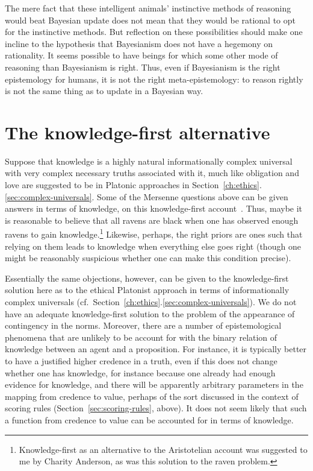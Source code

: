 The mere fact that these intelligent animals' instinctive methods of reasoning would beat Bayesian update does not mean that they would be rational to opt for the instinctive methods. But reflection on these possibilities should make one incline to 
the hypothesis that Bayesianism does not have a hegemony on rationality. It seems possible to have beings for which some
other mode of reasoning than Bayesianism is right. Thus, even if Bayesianism is the right epistemology for humans,
it is not the right meta-epistemology: to reason rightly is not the same thing as to update in a Bayesian way. 

\section{The knowledge-first alternative}
Suppose that knowledge is a highly natural informationally complex universal with very complex necessary 
truths associated with it, much like obligation and love are suggested to be in Platonic approaches 
in Section~\ref{ch:ethics}.\ref{sec:complex-universals}. Some of the Mersenne questions above can be given answers in terms of knowledge, on this
knowledge-first account~. Thus,
maybe it is reasonable to believe that all ravens are black when one has observed enough ravens to gain
knowledge.\footnote{Knowledge-first as an alternative to the Aristotelian account was suggested to 
me by Charity Anderson, as was this solution to the raven problem.} Likewise, perhaps, 
the right priors are ones such that relying on them leads to knowledge when everything else goes
right (though one might be reasonably suspicious whether one can make this condition precise).

Essentially the same objections, however, can be given to the knowledge-first solution here as to the
ethical Platonist approach in terms of informationally complex universals (cf.\ Section~\ref{ch:ethics}.\ref{sec:complex-universals}). We do not
have an adequate knowledge-first solution to the problem of the appearance of contingency in the norms.
Moreover, there are a number of epistemological phenomena that are unlikely to be account for with the
binary relation of knowledge between an agent and a proposition. For instance, it is typically better to 
have a justified higher credence in a truth, even if this does not change whether one has knowledge,
for instance because one already had enough evidence for knowledge, and there will be apparently arbitrary
parameters in the mapping from credence to value, perhaps of the sort discussed in the context of scoring
rules (Section~\ref{sec:scoring-rules}, above).
It does not seem likely that such a function from credence to value can be accounted for in terms of 
knowledge.

